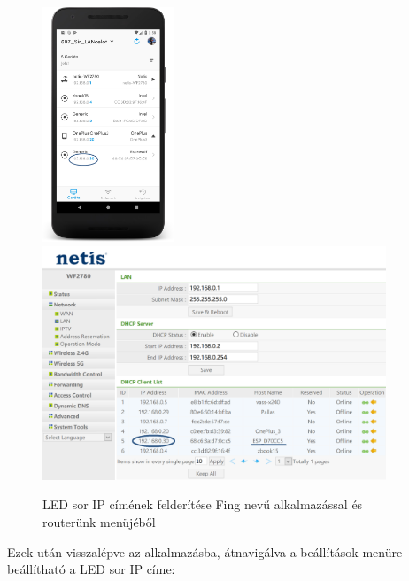 \documentclass[../main.tex]{subfiles}
\begin{document}
            \begin{figure}[!h]
                \includegraphics[height=7cm]{android_res/screen_pictures/ip_addr_fing}
                \includegraphics[height=7cm]{android_res/screen_pictures/ip_addr_router}
                \caption{LED sor IP címének felderítése Fing nevű alkalmazással és routerünk menüjéből}
            \end{figure}

            Ezek után visszalépve az alkalmazásba, átnavigálva a beállítások menüre beállítható a LED sor IP címe:
            
\end{document}
